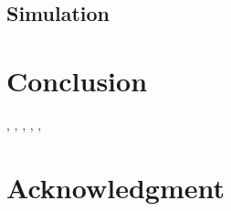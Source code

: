 \documentclass[conference]{IEEEtran}
\begin{document}


\subsection{Simulation}

\newpage
\section{Conclusion}
\cite{Tanaka2018},
\cite{Singh2012},
\cite{Ng2013},
\cite{Palan2017},
\cite{Sharma2006},
\cite{Haddad2009}
\section*{Acknowledgment}




% 
% 
\end{document}
